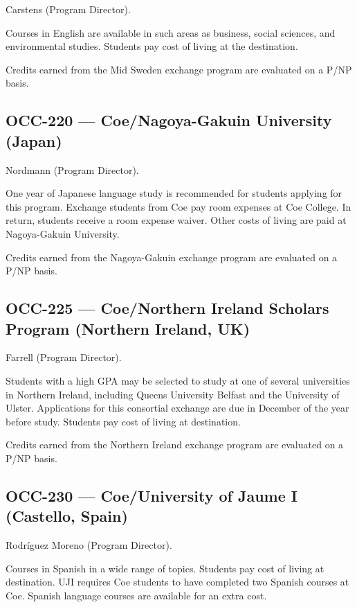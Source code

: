 \documentclass[
  letterpaper,
]{scrbook}
\begin{document}
Carstens (Program Director).

Courses in English are available in such areas as business, social
sciences, and environmental studies. Students pay cost of living at the
destination.

Credits earned from the Mid Sweden exchange program are evaluated on a
P/NP basis.

\subsection{OCC-220 --- Coe/Nagoya-Gakuin University
(Japan)}\label{occ-220-coenagoya-gakuin-university-japan}

Nordmann (Program Director).

One year of Japanese language study is recommended for students applying
for this program. Exchange students from Coe pay room expenses at Coe
College. In return, students receive a room expense waiver. Other costs
of living are paid at Nagoya-Gakuin University.

Credits earned from the Nagoya-Gakuin exchange program are evaluated on
a P/NP basis.

\subsection{OCC-225 --- Coe/Northern Ireland Scholars Program (Northern
Ireland,
UK)}\label{occ-225-coenorthern-ireland-scholars-program-northern-ireland-uk}

Farrell (Program Director).

Students with a high GPA may be selected to study at one of several
universities in Northern Ireland, including Queens University Belfast
and the University of Ulster. Applications for this consortial exchange
are due in December of the year before study. Students pay cost of
living at destination.

Credits earned from the Northern Ireland exchange program are evaluated
on a P/NP basis.

\subsection{OCC-230 --- Coe/University of Jaume I (Castello,
Spain)}\label{occ-230-coeuniversity-of-jaume-i-castello-spain}

Rodríguez Moreno (Program Director).

Courses in Spanish in a wide range of topics. Students pay cost of
living at destination. UJI requires Coe students to have completed two
Spanish courses at Coe. Spanish language courses are available for an
extra cost.
\end{document}
